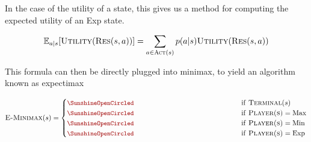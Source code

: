\documentclass[11pt]{article}
\begin{document}
In the case of the utility of a state, this gives us a method for computing the expected utility of an Exp state.




\[ \mathbb{E}_{a|s}[\mathrm{\textsc{Utility}}(\mathrm{\textsc{Res}}(s, a))]= \sum_{a \in \mathrm{\textsc{Act}}(s) } p(a | s) \mathrm{\textsc{Utility}}(\mathrm{\textsc{Res}}(s, a))  \]  

This formula can then be directly plugged into minimax, to yield an algorithm known as expectimax

\[ \msc{E-Minimax}(s) = \begin{cases} 
  \censorm{\msc{Utility}(s)} & \mathrm{if\ } \msc{Terminal}(s)  \\
  \censorm{\max_{a \in \msc{Act}(s) } \msc{E-Minimax}(\msc{Res}(s, a))} & \mathrm{if\ } \msc{Player(s)} = \mathrm{Max}  \\
  \censorm{\min_{a \in \msc{Act}(s) } \msc{E-Minimax}(\msc{Res}(s, a))} & \mathrm{if\ } \msc{Player(s)} = \mathrm{Min} \\ 
  \censorm{\sum_{a \in \msc{Act}(s) } p(a | s) \msc{E-Minimax}(\msc{Res}(s, a))} & \mathrm{if\ } \msc{Player(s)} = \mathrm{Exp} \end{cases}\] 
\end{document}
